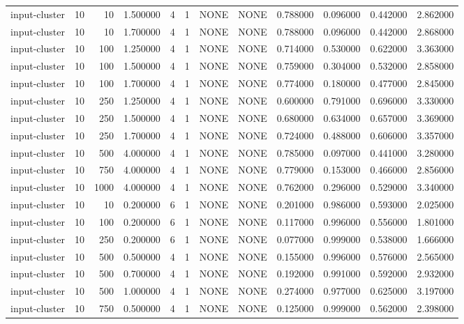 \begin{tabular}{lrrrllllrrrr}
input-cluster & 10 & 10 & 1.500000 & 4 & 1 & NONE & NONE & 0.788000 & 0.096000 & 0.442000 & 2.862000 \\
input-cluster & 10 & 10 & 1.700000 & 4 & 1 & NONE & NONE & 0.788000 & 0.096000 & 0.442000 & 2.868000 \\
input-cluster & 10 & 100 & 1.250000 & 4 & 1 & NONE & NONE & 0.714000 & 0.530000 & 0.622000 & 3.363000 \\
input-cluster & 10 & 100 & 1.500000 & 4 & 1 & NONE & NONE & 0.759000 & 0.304000 & 0.532000 & 2.858000 \\
input-cluster & 10 & 100 & 1.700000 & 4 & 1 & NONE & NONE & 0.774000 & 0.180000 & 0.477000 & 2.845000 \\
input-cluster & 10 & 250 & 1.250000 & 4 & 1 & NONE & NONE & 0.600000 & 0.791000 & 0.696000 & 3.330000 \\
input-cluster & 10 & 250 & 1.500000 & 4 & 1 & NONE & NONE & 0.680000 & 0.634000 & 0.657000 & 3.369000 \\
input-cluster & 10 & 250 & 1.700000 & 4 & 1 & NONE & NONE & 0.724000 & 0.488000 & 0.606000 & 3.357000 \\
input-cluster & 10 & 500 & 4.000000 & 4 & 1 & NONE & NONE & 0.785000 & 0.097000 & 0.441000 & 3.280000 \\
input-cluster & 10 & 750 & 4.000000 & 4 & 1 & NONE & NONE & 0.779000 & 0.153000 & 0.466000 & 2.856000 \\
input-cluster & 10 & 1000 & 4.000000 & 4 & 1 & NONE & NONE & 0.762000 & 0.296000 & 0.529000 & 3.340000 \\
input-cluster & 10 & 10 & 0.200000 & 6 & 1 & NONE & NONE & 0.201000 & 0.986000 & 0.593000 & 2.025000 \\
input-cluster & 10 & 100 & 0.200000 & 6 & 1 & NONE & NONE & 0.117000 & 0.996000 & 0.556000 & 1.801000 \\
input-cluster & 10 & 250 & 0.200000 & 6 & 1 & NONE & NONE & 0.077000 & 0.999000 & 0.538000 & 1.666000 \\
input-cluster & 10 & 500 & 0.500000 & 4 & 1 & NONE & NONE & 0.155000 & 0.996000 & 0.576000 & 2.565000 \\
input-cluster & 10 & 500 & 0.700000 & 4 & 1 & NONE & NONE & 0.192000 & 0.991000 & 0.592000 & 2.932000 \\
input-cluster & 10 & 500 & 1.000000 & 4 & 1 & NONE & NONE & 0.274000 & 0.977000 & 0.625000 & 3.197000 \\
input-cluster & 10 & 750 & 0.500000 & 4 & 1 & NONE & NONE & 0.125000 & 0.999000 & 0.562000 & 2.398000 \\

\end{tabular}
